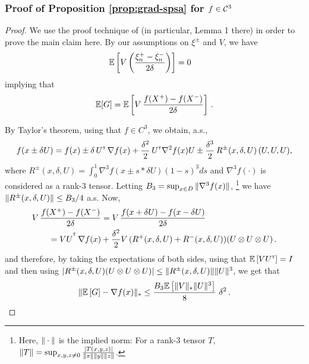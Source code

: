 \subsubsection*{Proof of Proposition \ref{prop:grad-spsa} for $f \in \mathcal{C}^3$}
\begin{proof}
We use the proof technique of \cite{spall1992multivariate} (in particular, Lemma 1 there) in order to prove the main claim here.
By our assumptions on $\xi^{\pm}$ and $V$,  we have
\begin{align*}
&\mathbb{E}\left[  V\left(\dfrac{\xi_n^+ - \xi_n^-}{2\delta}\right) \right]= 0 
\end{align*}
implying that
\begin{align*}
\mathbb{E}[G] =  \mathbb{E}\left[V\,  \dfrac{f(X^+)  -f(X^-)}{2\delta} \right]\,.
\end{align*}

By Taylor's theorem, using that $f\in C^3$, we obtain, a.s., 
\begin{align*}
f(x \pm \delta U) =
 f(x) 
 \pm\delta\,  U^\mathsf{\scriptscriptstyle T}\,\nabla f(x)   
  + \frac{\delta^2}{2}\, U^\mathsf{\scriptscriptstyle T} \nabla^2 f(x) U 
  \pm  \frac{\delta^3}{2} \, R^{\pm}(x,\delta,U) \,(U, U, U),
\end{align*}
where
$R^{\pm}(x,\delta,U)= \int_0^1  \nabla^3 f(  x \pm s * \delta U ) (1-s)^3 ds $ and $\nabla^3 f(\cdot)$ is considered as a rank-3 tensor.
Letting $B_3 = \sup_{x\in D} \| \nabla^3 f(x) \|$,%
\footnote{Here, $\|\cdot\|$ is the implied norm: For a rank-3 tensor $T$, $\|T\| = \sup_{x,y,z\ne 0}
\frac{|T (x,y,z)|}{\|x\|\|y\|\|z\|}$.
}
we have $\| R^{\pm}(x,\delta,U)\| \le B_3/4$ a.s.
Now,
\begin{align}
\begin{split}
\MoveEqLeft       V\, \dfrac{f(X^+)-f(X^-)}{2\delta}
  = V\, \dfrac{f(x+\delta U) - f(x-\delta U)}{2\delta} \\
&= VU^{\tr}
\, \nabla f(x)   +   \frac{\delta^2}{2}  V \,(R^{+}(x,\delta,U)+R^{-}(x,\delta,U))(U \otimes U \otimes U)\,. 
\end{split}
\label{eq:l1}
\end{align}
and therefore, 
by taking the expectations of both sides, 
using that $\mathbb{E}\left[V U^\mathsf{\scriptscriptstyle T}\right] = I$ and then using $|R^{\pm}(x,\delta,U) (U \otimes U \otimes U)| \le 
\|R^{\pm}(x,\delta,U)\| \|U\|^3$, 
we get that
\begin{align*}
\| \mathbb{E}\left[ G \right] - \nabla f(x) \|_* 
\le \frac{B_3 \mathbb{E}\left[ \|V\|_* \|U\|^3 \right]}{8}\,\, \delta^2 \,.
\end{align*}


\end{proof}
